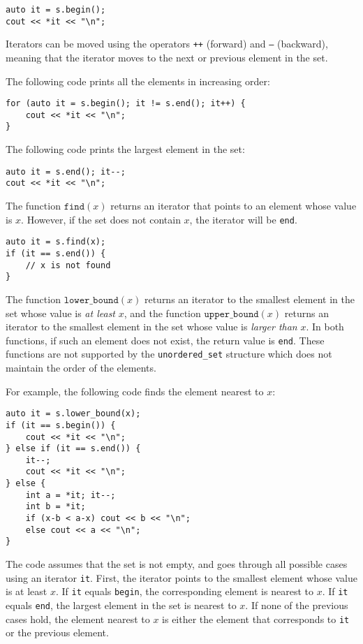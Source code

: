 \begin{lstlisting}
auto it = s.begin();
cout << *it << "\n";
\end{lstlisting}

Iterators can be moved using the operators
\texttt{++} (forward) and \texttt{--} (backward),
meaning that the iterator moves to the next
or previous element in the set.

The following code prints all the elements
in increasing order:
\begin{lstlisting}
for (auto it = s.begin(); it != s.end(); it++) {
    cout << *it << "\n";
}
\end{lstlisting}
The following code prints the largest element in the set:
\begin{lstlisting}
auto it = s.end(); it--;
cout << *it << "\n";
\end{lstlisting}

The function $\texttt{find}(x)$ returns an iterator
that points to an element whose value is $x$.
However, if the set does not contain $x$,
the iterator will be \texttt{end}.

\begin{lstlisting}
auto it = s.find(x);
if (it == s.end()) {
    // x is not found
}
\end{lstlisting}

The function $\texttt{lower\_bound}(x)$ returns
an iterator to the smallest element in the set
whose value is \emph{at least} $x$, and
the function $\texttt{upper\_bound}(x)$
returns an iterator to the smallest element in the set
whose value is \emph{larger than} $x$.
In both functions, if such an element does not exist,
the return value is \texttt{end}.
These functions are not supported by the
\texttt{unordered\_set} structure which
does not maintain the order of the elements.

\begin{samepage}
For example, the following code finds the element
nearest to $x$:

\begin{lstlisting}
auto it = s.lower_bound(x);
if (it == s.begin()) {
    cout << *it << "\n";
} else if (it == s.end()) {
    it--;
    cout << *it << "\n";
} else {
    int a = *it; it--;
    int b = *it;
    if (x-b < a-x) cout << b << "\n";
    else cout << a << "\n";
}
\end{lstlisting}

The code assumes that the set is not empty,
and goes through all possible cases
using an iterator \texttt{it}.
First, the iterator points to the smallest
element whose value is at least $x$.
If \texttt{it} equals \texttt{begin},
the corresponding element is nearest to $x$.
If \texttt{it} equals \texttt{end},
the largest element in the set is nearest to $x$.
If none of the previous cases hold,
the element nearest to $x$ is either the
element that corresponds to \texttt{it} or the previous element.
\end{samepage}

